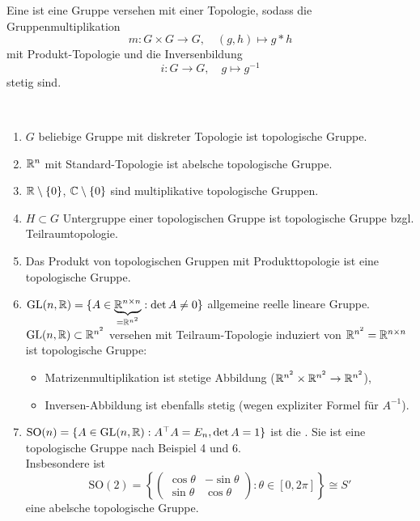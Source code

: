 \begin{remark}\label{exkurs:topologischeGruppe}
  Eine  ist eine Gruppe versehen mit einer Topologie, sodass die Gruppenmultiplikation
  \begin{equation*}
    m: G \times G \to G, \quad (g,h) \mapsto g*h
  \end{equation*}
  mit Produkt-Topologie und die Inversenbildung
  \begin{equation*}
    i: G \to G, \quad g \mapsto g^{-1 }
  \end{equation*}
  stetig sind.
\end{remark}

\begin{example}
  \
  \begin{enumerate}
    \item \( G \) beliebige Gruppe mit diskreter Topologie ist topologische Gruppe.
    \item \( \mathbb{R}^n \) mit Standard-Topologie ist abelsche topologische Gruppe.
    \item \( \mathbb{R} \setminus \{ 0 \} \), \( \mathbb{C} \setminus \{ 0 \} \) sind multiplikative topologische Gruppen.
    \item \( H \subset G \) Untergruppe einer topologischen Gruppe ist topologische Gruppe bzgl. Teilraumtopologie.
    \item Das Produkt von topologischen Gruppen mit Produkttopologie ist eine topologische Gruppe.
    \item \( \text{GL}(n,\mathbb{R}) = \{ A \in \underbrace{\mathbb{R}^{n \times n}}_{= \mathbb{R}^{n^2}} : \det A \neq 0 \} \) allgemeine reelle lineare Gruppe. \\
      \( \text{GL}(n,\mathbb{R}) \subset \mathbb{R}^{n^2} \) versehen mit Teilraum-Topologie induziert von \( \mathbb{R}^{n^2} = \mathbb{R}^{n \times n} \) ist topologische Gruppe:
      \begin{itemize}
        \item Matrizenmultiplikation ist stetige Abbildung (\( \mathbb{R}^{n^2} \times \mathbb{R}^{n^2} \to \mathbb{R}^{n^2} \)),
        \item Inversen-Abbildung ist ebenfalls stetig (wegen expliziter Formel für \( A^{-1} \)).
      \end{itemize}
    \item \( \text{SO}(n) = \{ A \in \text{GL}(n,\mathbb{R}) : A^\top A = E_n, \det A = 1 \} \) ist die . Sie ist eine topologische Gruppe nach Beispiel 4 und 6. \\
      Insbesondere ist
      \begin{equation*}
        \text{SO}(2) = \left \{ \begin{pmatrix}
          \cos \theta & -\sin \theta \\
          \sin \theta & \cos \theta
        \end{pmatrix} : \theta \in [0, 2\pi] \right \} \cong S'
      \end{equation*}
      eine abelsche topologische Gruppe.
  \end{enumerate}
\end{example}


